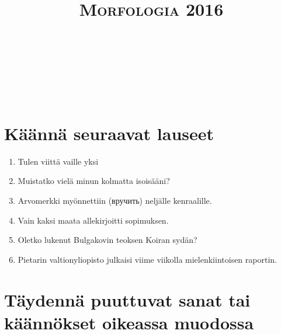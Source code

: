 \documentclass[paper=a4, fontsize=11pt]{scrartcl}
\title{	
\normalfont \normalsize 
\textsc{Morfologia 2016} \\ [25pt] 
\horrule{0.5pt} \\[0.4cm] 
\huge  \\ 
\horrule{2pt} \\[0.5cm] 
}
\date{}
\begin{document}
\onehalfspacing


\section{Käännä seuraavat lauseet}\label{kuxe4uxe4nnuxe4-venuxe4juxe4ksi}

\begin{enumerate}
\def\labelenumi{\arabic{enumi}.}
\item Tulen viittä vaille yksi \\
    \underline{\hspace{12cm}}
\item Muistatko vielä minun kolmatta isoisääni? \\
    \underline{\hspace{12cm}}
\item Arvomerkki myönnettiin (вручить) neljälle kenraalille. \\
    \underline{\hspace{12cm}}
\item Vain kaksi maata allekirjoitti sopimuksen. \\
    \underline{\hspace{12cm}}
\item Oletko lukenut Bulgakovin teoksen Koiran sydän?\\
    \underline{\hspace{12cm}}
\item Pietarin valtionyliopisto julkaisi viime viikolla mielenkiintoisen raportin.  \\
    \underline{\hspace{12cm}}
\end{enumerate}


\section{Täydennä puuttuvat sanat tai käännökset oikeassa muodossa}
\end{document}
